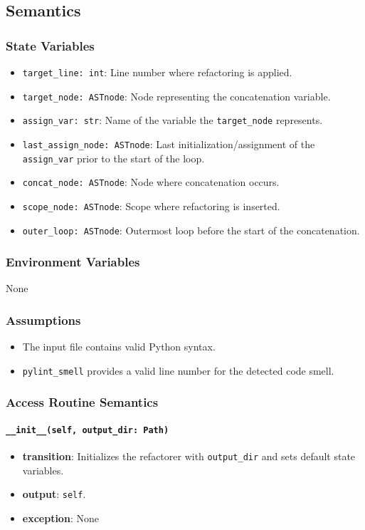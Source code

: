 \documentclass[12pt, titlepage]{article}
\begin{document}
\subsection{Semantics}
  
\subsubsection{State Variables}
\begin{itemize}
  \item \texttt{target\_line: int}: Line number where refactoring is applied.
  \item \texttt{target\_node: ASTnode}: Node representing the concatenation variable.
  \item \texttt{assign\_var: str}: Name of the variable the \texttt{target\_node} represents.
  \item \texttt{last\_assign\_node: ASTnode}: Last initialization/assignment of the \texttt{assign\_var} prior to the start of the loop.
  \item \texttt{concat\_node: ASTnode}: Node where concatenation occurs.
  \item \texttt{scope\_node: ASTnode}: Scope where refactoring is inserted.
  \item \texttt{outer\_loop: ASTnode}: Outermost loop before the start of the concatenation.
\end{itemize}
  
\subsubsection{Environment Variables}
None
  
\subsubsection{Assumptions}
\begin{itemize}
  \item The input file contains valid Python syntax.
  \item \texttt{pylint\_smell} provides a valid line number for the detected code smell.
\end{itemize}
  
\subsubsection{Access Routine Semantics}
  
\paragraph{\texttt{\_\_init\_\_(self, output\_dir: Path)}}
\begin{itemize}
  \item \textbf{transition}: Initializes the refactorer with \texttt{output\_dir} and sets default state variables.
  \item \textbf{output}: \texttt{self}.
  \item \textbf{exception}: None
\end{itemize}
  
\end{document}
